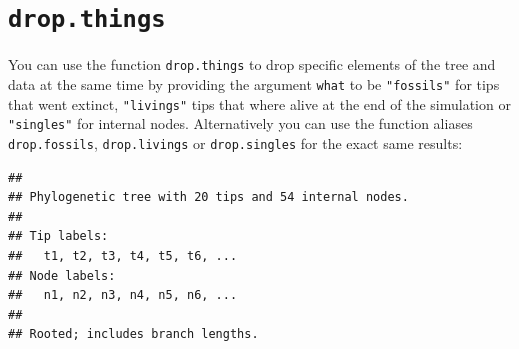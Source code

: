 \documentclass[
]{book}
\newenvironment{Shaded}{\begin{snugshade}}{\end{snugshade}}
\newcommand{\CommentTok}[1]{\textcolor[rgb]{0.56,0.35,0.01}{\textit{#1}}}
\newcommand{\DataTypeTok}[1]{\textcolor[rgb]{0.13,0.29,0.53}{#1}}
\newcommand{\DecValTok}[1]{\textcolor[rgb]{0.00,0.00,0.81}{#1}}
\newcommand{\FloatTok}[1]{\textcolor[rgb]{0.00,0.00,0.81}{#1}}
\newcommand{\KeywordTok}[1]{\textcolor[rgb]{0.13,0.29,0.53}{\textbf{#1}}}
\newcommand{\NormalTok}[1]{#1}
\newcommand{\OperatorTok}[1]{\textcolor[rgb]{0.81,0.36,0.00}{\textbf{#1}}}
\newcommand{\StringTok}[1]{\textcolor[rgb]{0.31,0.60,0.02}{#1}}
\begin{document}
\hypertarget{dropthings}{%
\section{\texorpdfstring{\texttt{drop.things}}{drop.things}}\label{dropthings}}

You can use the function \texttt{drop.things} to drop specific elements of the tree and data at the same time by providing the argument \texttt{what} to be \texttt{"fossils"} for tips that went extinct, \texttt{"livings"} tips that where alive at the end of the simulation or \texttt{"singles"} for internal nodes.
Alternatively you can use the function aliases \texttt{drop.fossils}, \texttt{drop.livings} or \texttt{drop.singles} for the exact same results:

\begin{Shaded}
\end{Shaded}

\begin{verbatim}
## 
## Phylogenetic tree with 20 tips and 54 internal nodes.
## 
## Tip labels:
##   t1, t2, t3, t4, t5, t6, ...
## Node labels:
##   n1, n2, n3, n4, n5, n6, ...
## 
## Rooted; includes branch lengths.
\end{verbatim}

\begin{Shaded}
\end{Shaded}
\end{document}
